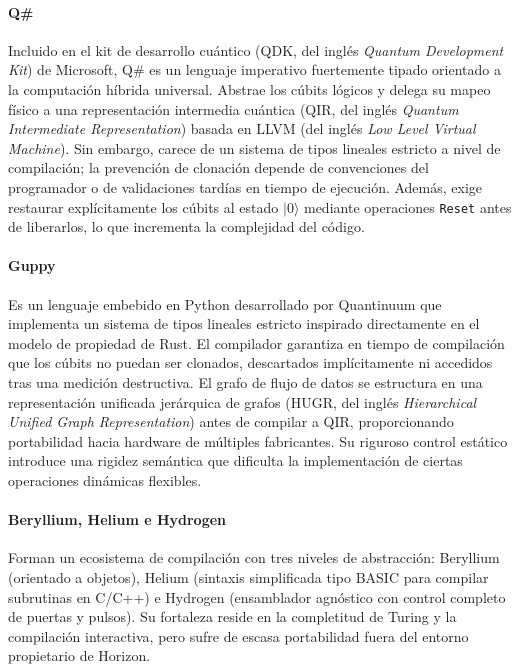 \paragraph{Q\#}
Incluido en el kit de desarrollo cuántico (QDK, del inglés \textit{Quantum Development Kit}) de Microsoft, Q\# es un lenguaje imperativo fuertemente tipado orientado a la computación híbrida universal. Abstrae los cúbits lógicos y delega su mapeo físico a una representación intermedia cuántica (QIR, del inglés \textit{Quantum Intermediate Representation}) basada en LLVM (del inglés \textit{Low Level Virtual Machine}). Sin embargo, carece de un sistema de tipos lineales estricto a nivel de compilación; la prevención de clonación depende de convenciones del programador o de validaciones tardías en tiempo de ejecución. Además, exige restaurar explícitamente los cúbits al estado $|0\rangle$ mediante operaciones \lstinline|Reset| antes de liberarlos, lo que incrementa la complejidad del código.

\paragraph{Guppy}
Es un lenguaje embebido en Python desarrollado por Quantinuum que implementa un sistema de tipos lineales estricto inspirado directamente en el modelo de propiedad de Rust. El compilador garantiza en tiempo de compilación que los cúbits no puedan ser clonados, descartados implícitamente ni accedidos tras una medición destructiva. El grafo de flujo de datos se estructura en una representación unificada jerárquica de grafos (HUGR, del inglés \textit{Hierarchical Unified Graph Representation}) antes de compilar a QIR, proporcionando portabilidad hacia hardware de múltiples fabricantes. Su riguroso control estático introduce una rigidez semántica que dificulta la implementación de ciertas operaciones dinámicas flexibles.

\paragraph{Beryllium, Helium e Hydrogen}
Forman un ecosistema de compilación con tres niveles de abstracción: Beryllium (orientado a objetos), Helium (sintaxis simplificada tipo BASIC para compilar subrutinas en C/C++) e Hydrogen (ensamblador agnóstico con control completo de puertas y pulsos). Su fortaleza reside en la completitud de Turing y la compilación interactiva, pero sufre de escasa portabilidad fuera del entorno propietario de Horizon.

